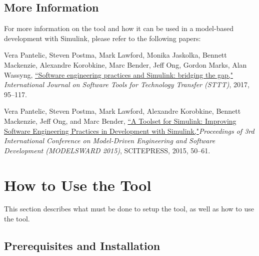 \documentclass{article}
\begin{document}
\subsection{More Information}
For more information on the tool and how it can be used in a model-based development with Simulink, please refer to the following papers:

\vspace{1em}
Vera Pantelic, Steven Postma, Mark Lawford, Monika Jaskolka, Bennett Mackenzie, Alexandre Korobkine, Marc Bender, Jeff Ong, Gordon Marks, Alan Wassyng, \href{https://link.springer.com/article/10.1007/s10009-017-0450-9}{``Software engineering practices and Simulink: bridging the gap,"} \textit{International Journal on Software Tools for Technology Transfer (STTT)}, 2017, 95--117.

\vspace{1em}
Vera Pantelic, Steven Postma, Mark Lawford, Alexandre Korobkine, Bennett Mackenzie, Jeff Ong, and Marc Bender, \href{http://www.cas.mcmaster.ca/~lawford/papers/MODELSWARD2015.pdf}{``A Toolset for Simulink: Improving Software Engineering Practices in Development with Simulink,"}\textit{Proceedings of 3rd International Conference on Model-Driven Engineering and Software Development (MODELSWARD 2015)}, SCITEPRESS, 2015, 50--61.

\section{How to Use the Tool}
This section describes what must be done to setup the tool, as well as how to use the tool.

\subsection{Prerequisites and Installation}
\end{document}
